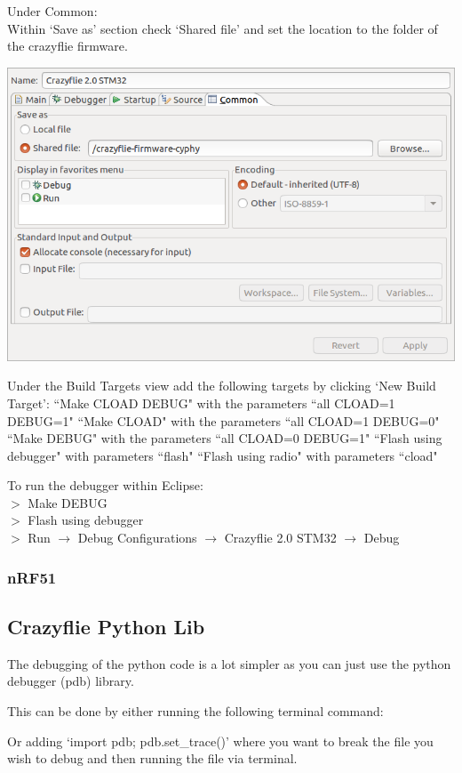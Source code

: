 \documentclass[]{article}
\begin{document}
Under Common: \\
Within `Save as' section check `Shared file' and set the location to the folder of the crazyflie firmware.

\includegraphics[width=0.55\linewidth]{DebugConfig4.png}

Under the Build Targets view add the following targets by clicking `New Build Target':
``Make CLOAD DEBUG" with the parameters ``all CLOAD=1 DEBUG=1"
``Make CLOAD" with the parameters ``all CLOAD=1 DEBUG=0"
``Make DEBUG" with the parameters ``all CLOAD=0 DEBUG=1"
``Flash using debugger" with parameters ``flash"
``Flash using radio" with parameters ``cload"


To run the debugger within Eclipse:\\
$>$ Make DEBUG \\
$>$ Flash using debugger \\
$>$ Run $\rightarrow$ Debug Configurations $\rightarrow$ Crazyflie 2.0 STM32 $\rightarrow$ Debug

\subsubsection{nRF51}

\subsection{Crazyflie Python Lib}

The debugging of the python code is a lot simpler as you can just use the python debugger (pdb) library.

This can be done by either running the following terminal command:


Or adding `import pdb; pdb.set\_trace()' where you want to break the file you wish to debug and then running the file via terminal.
\end{document}
